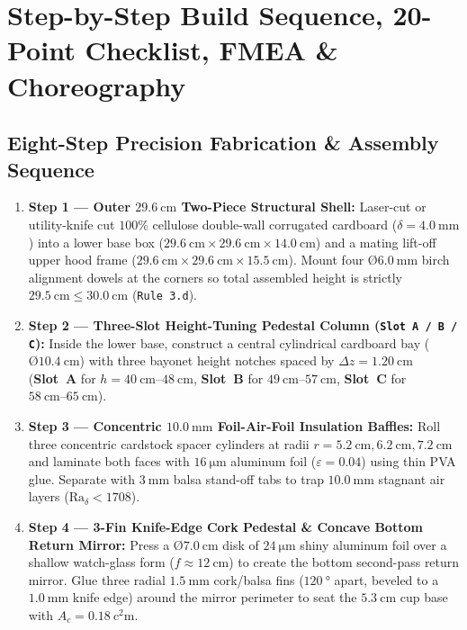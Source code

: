 \section{Step-by-Step Build Sequence, 20-Point Checklist, FMEA \& Choreography}\label{sec:15.7}

\subsection{Eight-Step Precision Fabrication \& Assembly Sequence}
\begin{enumerate}
  \item \textbf{Step 1 --- Outer $\SI{29.6}{\centi\meter}$ Two-Piece Structural Shell:} Laser-cut or utility-knife cut $100\%$ cellulose double-wall corrugated cardboard ($\delta = \SI{4.0}{\milli\meter}$) into a lower base box ($\SI{29.6}{\centi\meter} \times \SI{29.6}{\centi\meter} \times \SI{14.0}{\centi\meter}$) and a mating lift-off upper hood frame ($\SI{29.6}{\centi\meter} \times \SI{29.6}{\centi\meter} \times \SI{15.5}{\centi\meter}$). Mount four $\text{\O}\SI{6.0}{\milli\meter}$ birch alignment dowels at the corners so total assembled height is strictly $\SI{29.5}{\centi\meter} \le \SI{30.0}{\centi\meter}$ (\texttt{Rule 3.d}).
  \item \textbf{Step 2 --- Three-Slot Height-Tuning Pedestal Column (\texttt{Slot A / B / C}):} Inside the lower base, construct a central cylindrical cardboard bay ($\text{\O}\SI{10.4}{\centi\meter}$) with three bayonet height notches spaced by $\Delta z = \SI{1.20}{\centi\meter}$ (\textbf{Slot~A} for $h=\SIrange{40}{48}{\centi\meter}$, \textbf{Slot~B} for $\SIrange{49}{57}{\centi\meter}$, \textbf{Slot~C} for $\SIrange{58}{65}{\centi\meter}$).
  \item \textbf{Step 3 --- Concentric $\SI{10.0}{\milli\meter}$ Foil-Air-Foil Insulation Baffles:} Roll three concentric cardstock spacer cylinders at radii $r = \SI{5.2}{\centi\meter}, \SI{6.2}{\centi\meter}, \SI{7.2}{\centi\meter}$ and laminate both faces with $\SI{16}{\micro\meter}$ aluminum foil ($\varepsilon = 0.04$) using thin PVA glue. Separate with $\SI{3}{\milli\meter}$ balsa stand-off tabs to trap $\SI{10.0}{\milli\meter}$ stagnant air layers ($\mathrm{Ra}_\delta < 1708$).
  \item \textbf{Step 4 --- 3-Fin Knife-Edge Cork Pedestal \& Concave Bottom Return Mirror:} Press a $\text{\O}\SI{7.0}{\centi\meter}$ disk of $\SI{24}{\micro\meter}$ shiny aluminum foil over a shallow watch-glass form ($f \approx \SI{12}{\centi\meter}$) to create the bottom second-pass return mirror. Glue three radial $\SI{1.5}{\milli\meter}$ cork/balsa fins ($\SI{120}{\degree}$ apart, beveled to a $\SI{1.0}{\milli\meter}$ knife edge) around the mirror perimeter to seat the $\SI{5.3}{\centi\meter}$ cup base with $A_c = \SI{0.18}{\square\centi\meter}$.

\end{enumerate}
